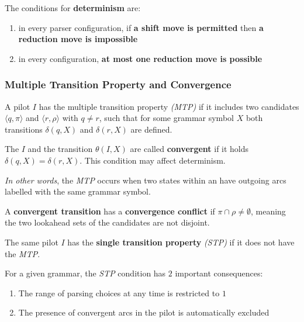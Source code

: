 \documentclass[english]{article}
\begin{document}
\bigskip
The conditions for \textbf{determinism} are:

\begin{enumerate}
  \item in every parser configuration, if \textbf{a shift move is permitted} then \textbf{a reduction move is impossible}
  \item in every configuration, \textbf{at most one reduction move is possible}
\end{enumerate}

\subsubsection{Multiple Transition Property and Convergence}
\label{sec:multiple-transition-property-and-convergence}

\begin{definition}
  A pilot \mstate \(I\) has the multiple transition property \textit{(MTP)} if it includes two candidates \(\langle q, \pi \rangle\) and \(\langle r, \rho\rangle\) with \(q \neq r\), such that for some grammar symbol \(X\) both transitions \(\delta(q, X)\) and \(\delta(r, X)\) are defined.
\end{definition}

\begin{definition}
  The \mstate \(I\) and the transition \(\theta(I, X)\) are called \textbf{convergent} if it holds \(\delta(q, X) = \delta(r, X)\).
  This condition may affect determinism.
\end{definition}

\textit{In other words}, the \textit{MTP} occurs when two states within an \mstate have outgoing arcs labelled with the same grammar symbol.

A \textbf{convergent transition} has a \textbf{convergence conflict} if \(\pi \cap \rho \neq \emptyset\), meaning the two lookahead sets of the candidates are not disjoint.

\bigskip
\begin{definition}
  \label{def:single-transition-property}
The same pilot \mstate \(I\) has the \textbf{single transition property} \textit{(STP)} if it does not have the \textit{MTP}.
\end{definition}

For a given grammar, the \textit{STP} condition has \(2\) important consequences:

\begin{enumerate}
  \item The range of parsing choices at any time is restricted to \(1\)
  \item The presence of convergent arcs in the pilot is automatically excluded
\end{enumerate}
\end{document}
